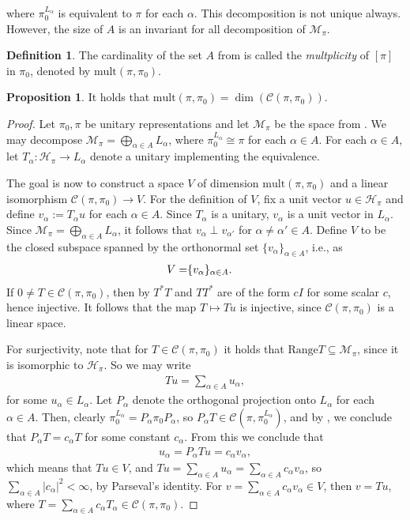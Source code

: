 \documentclass[10pt,twoside,openany,final]{memoir}
\theoremstyle{definition}
\newtheorem{proposition}[theorem]{Proposition}
\newtheorem{definition}[theorem]{Definition}
\theoremstyle{Break}
\renewcommand{\H}{\mathcal{H}}
\begin{document}
where $\pi_0^{L_\alpha}$ is equivalent to $\pi$ for each $\alpha$. This decomposition is not unique always. However, the size of $A$ is an invariant for all decomposition of $\mathcal{M}_\pi$. 
\begin{definition}
	The cardinality of the set $A$ from  is called the \emph{multplicity} of $[\pi]$ in $\pi_0$, denoted by $\mathrm{mult}(\pi,\pi_0)$.	
\end{definition}
\begin{proposition}
	It holds that $\mathrm{mult}(\pi,\pi_0)=\dim (\mathcal{C}(\pi,\pi_0))$.	
	\label{5.4}
\end{proposition}
\begin{proof}
	Let $\pi_0,\pi$ be unitary representations and let $\mathcal{M}_\pi$ be the space from . We may decompose $\mathcal{M}_\pi=\bigoplus_{\alpha \in A}L_\alpha$, where $\pi_0^{L_\alpha}\cong \pi$ for each $\alpha \in A$. For each $\alpha \in A$, let $T_\alpha \colon \H_\pi \to L_\alpha$ denote a unitary implementing the equivalence. 

	The goal is now to construct a space $V$ of dimension $\mathrm{mult}(\pi,\pi_0)$ and a linear isomorphism $\mathcal{C}(\pi,\pi_0) \to V$. For the definition of $V$, fix a unit vector $u \in \H_\pi$ and define $v_\alpha:=T_\alpha u$ for each $\alpha \in A$. Since $T_\alpha$ is a unitary, $v_\alpha$ is a unit vector in $L_\alpha$. Since $\mathcal{M}_\pi= \bigoplus_{\alpha \in A} L_\alpha$, it follows that $v_\alpha  \perp v_{\alpha'}$ for $\alpha \neq \alpha' \in A$. Define $V$ to be the closed subspace spanned by the orthonormal set $\{v_\alpha\}_{\alpha \in A}$, i.e., as
	\begin{align*}
		V= \span \{v_\alpha\}_{\alpha \in A}.
	\end{align*}
	If $0\neq T \in\mathcal{C}(\pi,\pi_0)$, then by  $T^*T$ and $TT^*$ are of the form $cI$ for some scalar $c$, hence injective. It follows that the map $T \mapsto Tu$ is injective, since $\mathcal{C}(\pi,\pi_0)$ is a linear space.

	For surjectivity, note that for $T \in \mathcal{C}(\pi,\pi_0)$ it holds that $\mathrm{Range}T \subseteq \mathcal{M}_\pi$, since it is isomorphic to $\H_\pi$. So we may write
	\begin{align*}
		Tu=\sum_{\alpha \in A} u_\alpha,
	\end{align*}
	for some $u_\alpha \in L_\alpha$. Let $P_\alpha$ denote the orthogonal projection onto $L_\alpha$ for each $\alpha \in A$. Then, clearly $\pi_0^{L_\alpha}=P_\alpha \pi_0 P_\alpha$, so $P_\alpha T \in  \mathcal{C}(\pi,\pi_0^{L_\alpha})$, and by , we conclude that $P_\alpha T = c_\alpha T$ for some constant $ c_\alpha$. From this we conclude that
	\begin{align*}
		u_\alpha = P_\alpha T u = c_\alpha v_\alpha,
	\end{align*}
	which means that $Tu \in V$, and $Tu=\sum_{\alpha \in A} u_\alpha = \sum_{\alpha \in A}c_\alpha v_\alpha$, so $\sum_{\alpha \in A} | c_\alpha|^2 < \infty$, by Parseval's identity. For $v  = \sum_{\alpha \in A} c_\alpha v_\alpha \in V$, then $v=T u$, where $T=\sum_{\alpha \in A}c_\alpha T_\alpha \in \mathcal{C}(\pi,\pi_0)$.
\end{proof}
\end{document}
